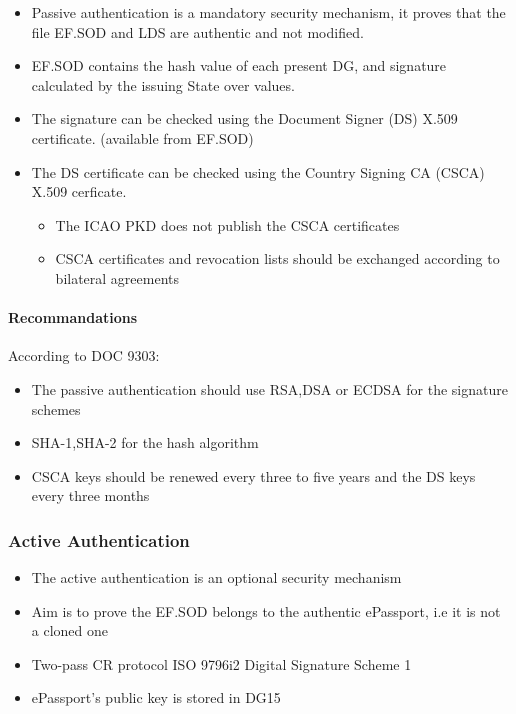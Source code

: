 \begin{itemize}
    \item Passive authentication is a mandatory security mechanism, it proves
    that the file EF.SOD and LDS are authentic and not modified.
    \item EF.SOD contains the hash value of each present DG, and signature
    calculated by the issuing State over values.
    \item The signature can be checked using the Document Signer (DS) X.509
    certificate. (available from EF.SOD)
    \item The DS certificate can be checked using the Country Signing CA (CSCA)
    X.509 cerficate.
    \begin{itemize}
        \item The ICAO PKD does not publish the CSCA certificates
        \item CSCA certificates and revocation lists should be exchanged
        according to bilateral agreements
    \end{itemize}
\end{itemize}

\paragraph{Recommandations} According to DOC 9303:
\begin{itemize}
    \item The passive authentication should use RSA,DSA or ECDSA for the
    signature schemes
    \item SHA-1,SHA-2 for the hash algorithm
    \item CSCA keys should be renewed every three to five years and the DS
    keys every three months
\end{itemize}

\subsubsection{Active Authentication}
\begin{itemize}
    \item The active authentication is an optional security mechanism
    \item Aim is to prove the EF.SOD belongs to the authentic ePassport, i.e
    it is not a cloned one
    \item Two-pass CR protocol ISO 9796i\text{-}2 Digital Signature Scheme 1
    \item ePassport's public key is stored in DG15
\end{itemize}

